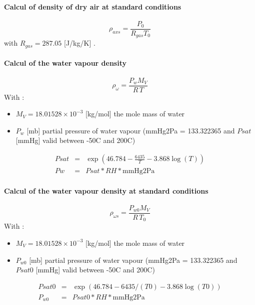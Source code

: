 \paragraph*{Calcul of density of dry air at standard conditions}
\begin{equation}
	\rho_{axs} = \frac{P_0}{R_{gas}T_0}\label{subsubsec:rho_axs}
\end{equation}
with $R_{gas} = 287.05$ [J/kg/K] \cite{airDensityBrisbane}.

\paragraph*{Calcul of the water vapour density}
\begin{equation}
	\rho_\omega = \frac{P_wM_V}{R\,T}\label{subsubsec:rho_w}
\end{equation}
With :
\begin{itemize}
	\item $M_V = 18.01528\times 10^{-3}$ [kg/mol] the mole mass of water
	\item $P_w$ [mb] partial pressure of water vapour (mmHg2Pa = 133.322365 and $Psat$ [mmHg] valid between  -50\degree C and 200\degree C)
\end{itemize}

\begin{eqnarray}
	Psat &= &\exp\left(46.784-\frac{6435}{T}-3.868\log(T)\right)\nonumber\\
	Pw &= &Psat*RH*\text{mmHg2Pa}\nonumber
\end{eqnarray}	

\paragraph*{Calcul of the water vapour density at standard conditions}
\begin{equation}
	\rho_{\omega s} = \frac{P_{w0}M_V}{R\,T_0}\label{subsubsec:rho_ws}
\end{equation}
With :
\begin{itemize}
	\item $M_V = 18.01528\times 10^{-3}$ [kg/mol] the mole mass of water
	\item $P_{w0}$ [mb] partial pressure of water vapour (mmHg2Pa = 133.322365 and $Psat0$ [mmHg] valid between  -50\degree C and 200\degree C)
\end{itemize}

\begin{eqnarray}
	Psat0 &= &\exp\left(46.784-6435/(T0)-3.868\log(T0)\right)\nonumber\\
	P_{w0} &= &Psat0*RH*\text{mmHg2Pa}\nonumber
\end{eqnarray}	


